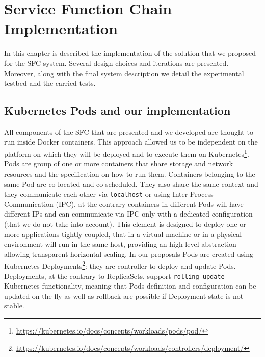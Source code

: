 \chapter{Service Function Chain Implementation}
\label{chap:impl}

\newcommand{\enchainer}{\texttt{Enchainer}}
\newcommand{\vnf}{\texttt{VNF}}
\newcommand{\vnfs}{\texttt{VNFs}}
\newcommand{\dispatcher}{\texttt{Dispatcher}}
\newcommand{\astaire}{\texttt{Astaire}}
\newcommand{\ironhide}{\texttt{Ironhide}}
\newcommand{\harbor}{\texttt{Harbor}}
\newcommand{\roulette}{\texttt{Roulette}}
\newcommand{\ingress}{\texttt{ingress}}
\newcommand{\ingresses}{\texttt{ingresses}}
\newcommand{\egress}{\texttt{egress}}
\newcommand{\egresses}{\texttt{egresses}}

In this chapter is described the implementation of the solution that we
proposed for the SFC system. Several design choices and iterations are
presented. Moreover, along with the final system description we detail the
experimental testbed and the carried tests. 

\section{Kubernetes Pods and our implementation}
All components of the SFC that are presented and we developed are thought to
run inside Docker containers. This approach allowed us to be independent on the
platform on which they will be deployed and to execute them on
Kubernetes\footnote{\url{https://kubernetes.io/docs/concepts/workloads/pods/pod/}}.
Pods are group of one or more containers that share storage and network
resources and the specification on how to run them. Containers belonging to the
same Pod are co-located and co-scheduled. They also share the same context and
they communicate each other via \texttt{localhost} or using Inter Process
Communication (IPC), at the contrary containers in different Pods will have
different IPs and can communicate via IPC only with a dedicated configuration
(that we do not take into account). This element is designed to deploy one or
more applications tightly coupled, that in a virtual machine or in a
physical environment will run in the same host, providing an high level
abstraction allowing transparent horizontal scaling. In our proposals Pods are
created using Kubernetes
Deployments\footnote{\url{https://kubernetes.io/docs/concepts/workloads/controllers/deployment/}}:
they are controller to deploy and update Pods. Deployments, at the contrary to
ReplicaSets, support \texttt{rolling-update} Kubernetes functionality, meaning
that Pods definition and configuration can be updated on the fly as well as
rollback are possible if Deployment state is not stable. 

